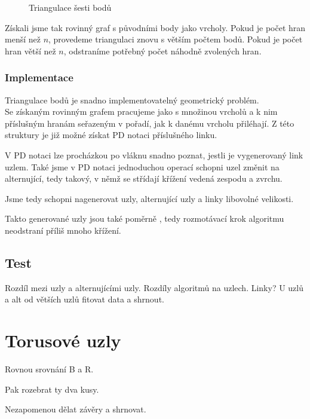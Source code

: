 \begin{figure}[h]  
\centering 
{}
\caption{Triangulace šesti bodů}
\end{figure}  

Získali jsme tak rovinný graf s původními body jako vrcholy. Pokud je počet hran menší než $n$, provedeme triangulaci znovu s větším počtem bodů. Pokud je počet hran větší než $n$, odstraníme potřebný počet náhodně zvolených hran.

\subsubsection{Implementace}

Triangulace bodů je snadno implementovatelný geometrický problém. \\ Se získaným rovinným grafem pracujeme jako s množinou vrcholů a k nim příslušným hranám seřazeným v pořadí, jak k danému vrcholu přiléhají. Z této struktury je již možné získat PD notaci příslušného linku.


V PD notaci lze procházkou po vláknu snadno poznat, jestli je vygenerovaný link uzlem. Také jsme v PD notaci jednoduchou operací schopni uzel změnit na alternující, tedy takový, v němž se střídají křížení vedená zespodu a zvrchu.

Jsme tedy schopni nagenerovat uzly, alternující uzly a linky libovolné velikosti.

Takto generované uzly jsou také poměrně , tedy rozmotávací krok algoritmu neodstraní příliš mnoho křížení.

\subsection{Test}
Rozdíl mezi uzly a alternujícími uzly.
Rozdíly algoritmů na uzlech.
Linky?
U uzlů a alt od větších uzlů fitovat data a shrnout.

\section{Torusové uzly}
Rovnou srovnání B a R.

Pak rozebrat ty dva kusy.

Nezapomenou dělat závěry a shrnovat.

